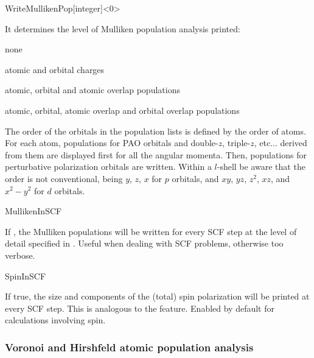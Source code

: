\begin{fdfentry}{WriteMullikenPop}[integer]<0>
  
  It determines the level of Mulliken population analysis printed:
  \begin{fdfoptions}
    \option[0]%
    none

    \option[1]%
    atomic and orbital charges

    \option[2]%
    atomic, orbital and atomic overlap populations

    \option[3]%
    atomic, orbital, atomic overlap and orbital overlap populations
    
  \end{fdfoptions}
  The order of the orbitals in the population lists is defined by the
  order of atoms. For each atom, populations for PAO orbitals and
  double-$z$, triple-$z$, etc... derived from them are displayed first
  for all the angular momenta. Then, populations for perturbative
  polarization orbitals are written.  Within a $l$-shell be aware that
  the order is not conventional, being $y$, $z$, $x$ for $p$ orbitals,
  and $xy$, $yz$, $z^2$, $xz$, and $x^2-y^2$ for $d$ orbitals.

\end{fdfentry}


\begin{fdflogicalF}{MullikenInSCF}

  If \fdftrue, the Mulliken populations will be written for every SCF
  step at the level of detail specified in
  . Useful when dealing with SCF problems,
  otherwise too verbose.
  
\end{fdflogicalF}


\begin{fdflogicalT}{SpinInSCF}

If true, the size and components of the (total) spin polarization will
be printed at every SCF step.  This is analogous to the
 feature.  Enabled by default for calculations
involving spin.

\end{fdflogicalT}

\subsubsection{Voronoi and Hirshfeld atomic population analysis}


